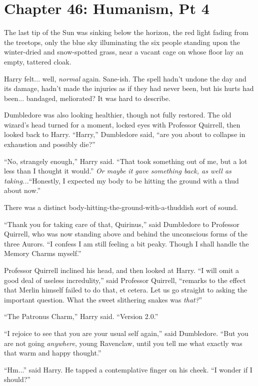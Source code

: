 \chapter{Chapter 46: Humanism, Pt 4}
The last tip of the Sun was sinking below the horizon, the red light fading from the treetops, only the blue sky illuminating the six people standing upon the winter-dried and snow-spotted grass, near a vacant cage on whose floor lay an empty, tattered cloak.

Harry felt... well, \emph{normal} again. Sane-ish. The spell hadn't undone the day and its damage, hadn't made the injuries as if they had never been, but his hurts had been... bandaged, meliorated? It was hard to describe.

Dumbledore was also looking healthier, though not fully restored. The old wizard's head turned for a moment, locked eyes with Professor Quirrell, then looked back to Harry. ``Harry,'' Dumbledore said, ``are you about to collapse in exhaustion and possibly die?''

``No, strangely enough,'' Harry said. ``That took something out of me, but a lot less than I thought it would.'' \emph{Or maybe it gave something back, as well as taking...}``Honestly, I expected my body to be hitting the ground with a thud about now.''

There was a distinct body-hitting-the-ground-with-a-thuddish sort of sound.

``Thank you for taking care of that, Quirinus,'' said Dumbledore to Professor Quirrell, who was now standing above and behind the unconscious forms of the three Aurors. ``I confess I am still feeling a bit peaky. Though I shall handle the Memory Charms myself.''

Professor Quirrell inclined his head, and then looked at Harry. ``I will omit a good deal of useless incredulity,'' said Professor Quirrell, ``remarks to the effect that Merlin himself failed to do that, et cetera. Let us go straight to asking the important question. What the sweet slithering snakes was \emph{that?}''

``The Patronus Charm,'' Harry said. ``Version 2.0.''

``I rejoice to see that you are your usual self again,'' said Dumbledore. ``But you are not going \emph{anywhere}, young Ravenclaw, until you tell me what exactly was that warm and happy thought.''

``Hm...'' said Harry. He tapped a contemplative finger on his cheek. ``I wonder if I should?''

